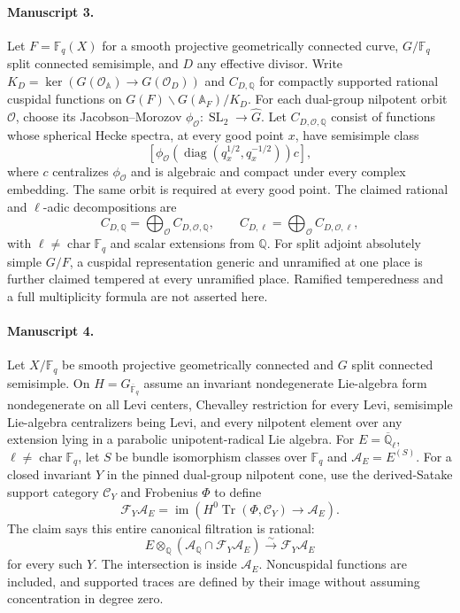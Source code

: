 \documentclass[11pt]{article}
\begin{document}
\paragraph{Manuscript 3.}
Let $F=\mathbb F_q(X)$ for a smooth projective geometrically connected curve, $G/\mathbb F_q$ split connected semisimple, and $D$ any effective divisor. Write $K_D=\ker(G(\mathcal O_{\mathbb A})\to G(\mathcal O_D))$ and $C_{D,\mathbb Q}$ for compactly supported rational cuspidal functions on $G(F)\backslash G(\mathbb A_F)/K_D$. For each dual-group nilpotent orbit $\mathcal O$, choose its Jacobson--Morozov $\phi_{\mathcal O}:\operatorname{SL}_2\to\widehat G$. Let $C_{D,\mathcal O,\mathbb Q}$ consist of functions whose spherical Hecke spectra, at every good point $x$, have semisimple class
\[
 [\phi_{\mathcal O}(\operatorname{diag}(q_x^{1/2},q_x^{-1/2}))c],
\]
where $c$ centralizes $\phi_{\mathcal O}$ and is algebraic and compact under every complex embedding. The same orbit is required at every good point. The claimed rational and $\ell$-adic decompositions are
\[
 C_{D,\mathbb Q}=\bigoplus_{\mathcal O} C_{D,\mathcal O,\mathbb Q},\qquad
 C_{D,\ell}=\bigoplus_{\mathcal O} C_{D,\mathcal O,\ell},
\]
with $\ell\ne\operatorname{char}\mathbb F_q$ and scalar extensions from $\mathbb Q$. For split adjoint absolutely simple $G/F$, a cuspidal representation generic and unramified at one place is further claimed tempered at every unramified place. Ramified temperedness and a full multiplicity formula are not asserted here.

\paragraph{Manuscript 4.}
Let $X/\mathbb F_q$ be smooth projective geometrically connected and $G$ split connected semisimple. On $H=G_{\overline{\mathbb F}_q}$ assume an invariant nondegenerate Lie-algebra form nondegenerate on all Levi centers, Chevalley restriction for every Levi, semisimple Lie-algebra centralizers being Levi, and every nilpotent element over any extension lying in a parabolic unipotent-radical Lie algebra. For $E=\overline{\mathbb Q}_{\ell}$, $\ell\ne\operatorname{char}\mathbb F_q$, let $S$ be bundle isomorphism classes over $\mathbb F_q$ and $\mathcal A_E=E^{(S)}$. For a closed invariant $Y$ in the pinned dual-group nilpotent cone, use the derived-Satake support category $\mathcal C_Y$ and Frobenius $\Phi$ to define
\[
 \mathcal F_Y\mathcal A_E=\operatorname{im}(H^0\operatorname{Tr}(\Phi,\mathcal C_Y)\to\mathcal A_E).
\]
The claim says this entire canonical filtration is rational:
\[
 E\otimes_{\mathbb Q}(\mathcal A_{\mathbb Q}\cap\mathcal F_Y\mathcal A_E)
 \xrightarrow{\sim}\mathcal F_Y\mathcal A_E
\]
for every such $Y$. The intersection is inside $\mathcal A_E$. Noncuspidal functions are included, and supported traces are defined by their image without assuming concentration in degree zero.
\end{document}
